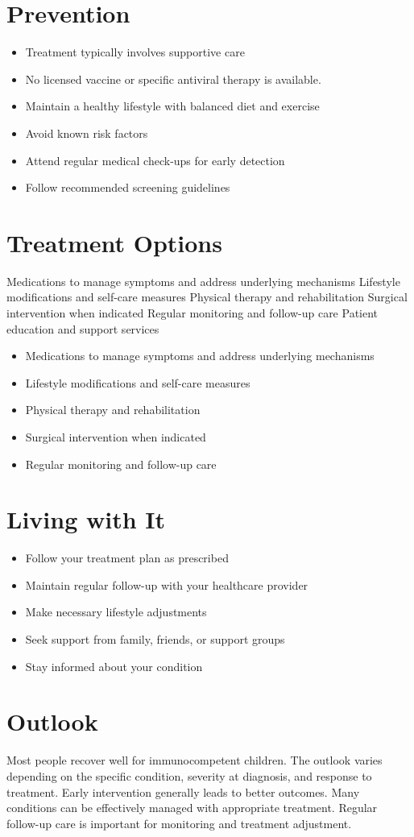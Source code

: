 \section{Prevention}
\begin{itemize}[noitemsep]
  \item Treatment typically involves supportive care
  \item No licensed vaccine or specific antiviral therapy is available.
  \item Maintain a healthy lifestyle with balanced diet and exercise
  \item Avoid known risk factors
  \item Attend regular medical check-ups for early detection
  \item Follow recommended screening guidelines
\end{itemize}
\section{Treatment Options}
Medications to manage symptoms and address underlying mechanisms Lifestyle modifications and self-care measures Physical therapy and rehabilitation Surgical intervention when indicated Regular monitoring and follow-up care Patient education and support services

\begin{itemize}[noitemsep]
  \item Medications to manage symptoms and address underlying mechanisms
  \item Lifestyle modifications and self-care measures
  \item Physical therapy and rehabilitation
  \item Surgical intervention when indicated
  \item Regular monitoring and follow-up care
\end{itemize}
\section{Living with It}
\begin{itemize}[noitemsep]
  \item Follow your treatment plan as prescribed
  \item Maintain regular follow-up with your healthcare provider
  \item Make necessary lifestyle adjustments
  \item Seek support from family, friends, or support groups
  \item Stay informed about your condition
\end{itemize}
\section{Outlook}
Most people recover well for immunocompetent children. The outlook varies depending on the specific condition, severity at diagnosis, and response to treatment. Early intervention generally leads to better outcomes. Many conditions can be effectively managed with appropriate treatment. Regular follow-up care is important for monitoring and treatment adjustment.

